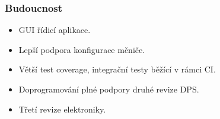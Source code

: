 \documentclass[%
  12pt,       				%
	t,                  %
	aspectratio=1610,   %
	unicode,						%
]{beamer}				    	%
\begin{document}
\begin{frame}
	\frametitle{Budoucnost}
	\begin{itemize}
		\item GUI řídicí aplikace.
		\item Lepší podpora konfigurace měniče.
		\item Větší test coverage, integrační testy běžící v rámci CI.
		\item Doprogramování plné podpory druhé revize DPS.
		\item Třetí revize elektroniky.
	\end{itemize}
\end{frame}

%
%
%
%
%
%
\end{document}
